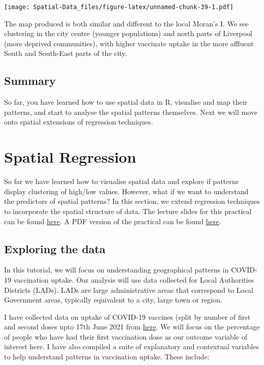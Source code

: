 \documentclass[
]{book}
\begin{document}
\texttt{[image: Spatial-Data\_files/figure-latex/unnamed-chunk-39-1.pdf]}

The map produced is both similar and different to the local Moran's I. We see clustering in the city centre (younger populations) and north parts of Liverpool (more deprived communities), with higher vaccinate uptake in the more affluent South and South-East parts of the city.

\hypertarget{summary-1}{%
\section{Summary}\label{summary-1}}

So far, you have learned how to use spatial data in R, visualise and map their patterns, and start to analyse the spatial patterns themselves. Next we will move onto spatial extensions of regression techniques.

\hypertarget{spatreg}{%
\chapter{Spatial Regression}\label{spatreg}}

So far we have learned how to visualise spatial data and explore if patterns display clustering of high/low values. However, what if we want to understand the predictors of spatial patterns? In this section, we extend regression techniques to incorporate the spatial structure of data. The lecture slides for this practical can be found \href{}{here}. A PDF version of the practical can be found \href{}{here}.

\hypertarget{exploring-the-data}{%
\section{Exploring the data}\label{exploring-the-data}}

In this tutorial, we will focus on understanding geographical patterns in COVID-19 vaccination uptake. Our analysis will use data collected for Local Authorities Districts (LADs). LADs are large administrative areas that correspond to Local Government areas, typically equivalent to a city, large town or region.

I have collected data on uptake of COVID-19 vaccines (split by number of first and second doses upto 17th June 2021 from \href{https://www.england.nhs.uk/statistics/statistical-work-areas/covid-19-vaccinations/}{here}. We will focus on the percentage of people who have had their first vaccination dose as our outcome variable of interest here. I have also compiled a suite of explanatory and contextual variables to help understand patterns in vaccination uptake. These include:
\end{document}

